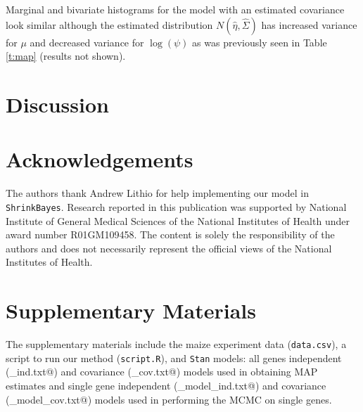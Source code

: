 \documentclass[useAMS,usenatbib,referee]{biom}
\begin{document}
Marginal and bivariate histograms for the model with an estimated covariance look similar although the estimated distribution $N(\hat{\eta},\hat{\Sigma})$ has increased variance for $\mu$ and decreased variance for $\log(\psi)$ as was previously seen in Table \ref{t:map} (results not shown). 

\section{Discussion}
\label{s:discuss}





\backmatter %

\section*{Acknowledgements}

The authors thank Andrew Lithio for help implementing our model in {\tt ShrinkBayes}. Research reported in this publication was supported by National Institute of General Medical Sciences of the National Institutes of Health under award number R01GM109458. The content is solely the responsibility of the authors and does not necessarily represent the official views of the National Institutes of Health.


\section*{Supplementary Materials}

The supplementary materials include the maize experiment data ({\tt data.csv}), a script to run our method ({\tt script.R}), and {\tt Stan} models: all genes independent (\verb@model_ind.txt@) and covariance (\verb@model_cov.txt@) models used in obtaining MAP estimates and single gene independent (\verb@sg_model_ind.txt@) and covariance (\verb@sg_model_cov.txt@) models used in performing the MCMC on single genes. 





\label{lastpage}
\end{document}
